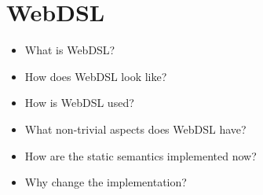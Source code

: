 
\chapter{\label{chap:webdsl}WebDSL}

  \begin{itemize}
    \item What is WebDSL?
    \item How does WebDSL look like?
    \item How is WebDSL used?
    \item What non-trivial aspects does WebDSL have?
    \item How are the static semantics implemented now?
    \item Why change the implementation?
  \end{itemize}
